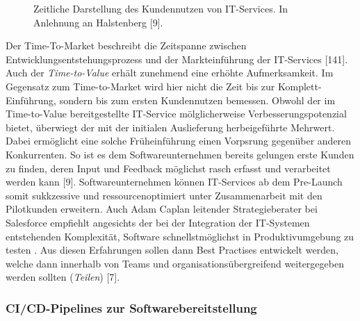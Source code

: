 \begin{center}
	\begin{figure}[H]
		\centering
		\caption[Zeitliche Darstellung des Kundennutzen von IT-Services]{Zeitliche Darstellung des Kundennutzen von IT-Services. In Anlehnung an Halstenberg \cite{Halstenberg.2020}[9].}
		\label{fig:TTM}
	\end{figure}
\end{center}
\vspace*{-10mm}
Der Time-To-Market beschreibt die Zeitspanne zwischen Entwicklungsentstehungsprozess und der Markteinführung der IT-Services \cite{Vesey.1992}[141]. Auch der \textit{Time-to-Value} erhält zunehmend eine erhöhte Aufmerksamkeit. Im Gegensatz zum Time-to-Market wird hier nicht die Zeit bis zur Komplett-Einführung, sondern bis zum ersten Kundennutzen bemessen. Obwohl der im Time-to-Value bereitgestellte IT-Service mölglicherweise Verbesserungspotenzial bietet, überwiegt der mit der initialen Auslieferung herbeigeführte Mehrwert. Dabei ermöglicht eine solche Früheinführung einen Vorpsrung gegenüber anderen Konkurrenten. So ist es dem Softwareunternehmen bereits gelungen erste Kunden zu finden, deren Input und Feedback möglichst rasch erfasst und verarbeitet werden kann \cite{Halstenberg.2020}[9]. Softwareunternehmen können IT-Services ab dem Pre-Launch somit sukkzessive und ressourcenoptimiert unter Zusammenarbeit mit den Pilotkunden erweitern. Auch Adam Caplan leitender Strategieberater bei Salesforce empfiehlt angesichts der bei der Integration der IT-Systemen entstehenden Komplexität, Software schnellstmöglichst in Produktivumgebung zu testen \cite{Vesey.1992}. Aus diesen Erfahrungen sollen dann Best Practises entwickelt werden, welche dann innerhalb von Teams und organisationsübergreifend weitergegeben werden sollten (\textit{Teilen}) \cite{Halstenberg.2020}[7]. 

\subsubsection{CI/CD-Pipelines zur Softwarebereitstellung}


